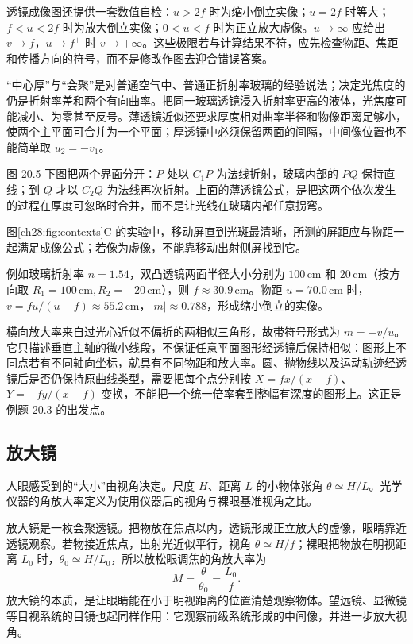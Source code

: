 透镜成像图还提供一套数值自检：$u>2f$ 时为缩小倒立实像；$u=2f$ 时等大；$f<u<2f$ 时为放大倒立实像；$0<u<f$ 时为正立放大虚像。$u\to\infty$ 应给出 $v\to f$，$u\to f^+$ 时 $v\to+\infty$。这些极限若与计算结果不符，应先检查物距、焦距和传播方向的符号，而不是修改作图去迎合错误答案。

“中心厚”与“会聚”是对普通空气中、普通正折射率玻璃的经验说法；决定光焦度的仍是折射率差和两个有向曲率。把同一玻璃透镜浸入折射率更高的液体，光焦度可能减小、为零甚至反号。薄透镜近似还要求厚度相对曲率半径和物像距离足够小，使两个主平面可合并为一个平面；厚透镜中必须保留两面的间隔，中间像位置也不能简单取 $u_2=-v_1$。

图 20.5 下图把两个界面分开：$P$ 处以 $C_1P$ 为法线折射，玻璃内部的 $PQ$ 保持直线；到 $Q$ 才以 $C_2Q$ 为法线再次折射。上面的薄透镜公式，是把这两个依次发生的过程在厚度可忽略时合并，而不是让光线在玻璃内部任意拐弯。
\ThinLensPanel
\LensImagingDiagram

图\ref{ch28:fig:contexts}C 的实验中，移动屏直到光斑最清晰，所测的屏距应与物距一起满足成像公式；若像为虚像，不能靠移动出射侧屏找到它。

例如玻璃折射率 $n=1.54$，双凸透镜两面半径大小分别为 $100\,\mathrm{cm}$ 和 $20\,\mathrm{cm}$（按方向取 $R_1=100\,\mathrm{cm},R_2=-20\,\mathrm{cm}$），则 $f\approx30.9\,\mathrm{cm}$。物距 $u=70.0\,\mathrm{cm}$ 时，$v=fu/(u-f)\approx55.2\,\mathrm{cm}$，$|m|\approx0.788$，形成缩小倒立的实像。

横向放大率来自过光心近似不偏折的两相似三角形，故带符号形式为 $m=-v/u$。它只描述垂直主轴的微小线段，不保证任意平面图形经透镜后保持相似：图形上不同点若有不同轴向坐标，就具有不同物距和放大率。圆、抛物线以及运动轨迹经透镜后是否仍保持原曲线类型，需要把每个点分别按 $X=fx/(x-f)$、$Y=-fy/(x-f)$ 变换，不能把一个统一倍率套到整幅有深度的图形上。这正是例题 20.3 的出发点。

\subsection*{放大镜}

人眼感受到的“大小”由视角决定。尺度 $H$、距离 $L$ 的小物体张角 $\theta\simeq H/L$。光学仪器的角放大率定义为使用仪器后的视角与裸眼基准视角之比。

放大镜是一枚会聚透镜。把物放在焦点以内，透镜形成正立放大的虚像，眼睛靠近透镜观察。若物接近焦点，出射光近似平行，视角 $\theta\simeq H/f$；裸眼把物放在明视距离 $L_0$ 时，$\theta_0\simeq H/L_0$，所以放松眼调焦的角放大率为
\begin{equation}
 M=\frac{\theta}{\theta_0}=\frac{L_0}{f}.
\end{equation}
放大镜的本质，是让眼睛能在小于明视距离的位置清楚观察物体。望远镜、显微镜等目视系统的目镜也起同样作用：它观察前级系统形成的中间像，并进一步放大视角。

